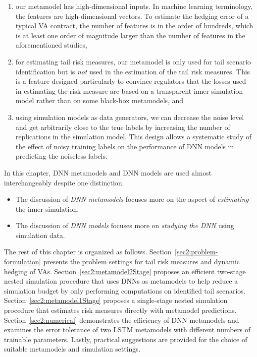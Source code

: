 \begin{enumerate}
    \item  our metamodel has high-dimensional inputs. In machine learning terminology, the features are high-dimensional vectors.
    To estimate the hedging error of a typical VA contract, the number of features is in the order of hundreds, which is at least one order of magnitude larger than the number of features in the aforementioned studies,
    \item  for estimating tail risk measures, our metamodel is only used for tail scenario identification but is \textit{not} used in the estimation of the tail risk measures.
    This is a feature designed particularly to convince regulators that the losses used in estimating the risk measure are based on a transparent inner simulation model rather than on some black-box metamodels, and
    \item  using simulation models as data generators, we can decrease the noise level and get arbitrarily close to the true labels by increasing the number of replications in the simulation model.
    This design allows a systematic study of the effect of noisy training labels on the performance of DNN models in predicting the noiseless labels.
\end{enumerate}

In this chapter, DNN metamodels and DNN models are used almost interchangeably despite one distinction.
\begin{itemize}
    \item The discussion of \textit{DNN metamodels} focuses more on the aspect of \textit{estimating} the inner simulation.
    \item The discussion of \textit{DNN models} focuses more on \textit{studying the DNN} using simulation data.
\end{itemize}

The rest of this chapter is organized as follows.
Section~\ref{sec2:problem-formulation} presents the problem settings for tail risk measures and dynamic hedging of VAs. 
Section~\ref{sec2:metamodel2Stage} proposes an efficient two-stage nested simulation procedure that uses DNNs as metamodels to help reduce a simulation budget by only performing computations on identified tail scenarios. 
Section~\ref{sec2:metamodel1Stage} proposes a single-stage nested simulation procedure that estimates risk measures directly with metamodel predictions.
Section~\ref{sec2:numerical} demonstrates the efficiency of DNN metamodels and examines the error tolerance of two LSTM metamodels with different numbers of trainable parameters. 
Lastly, practical suggestions are provided for the choice of suitable metamodels and simulation settings. 


